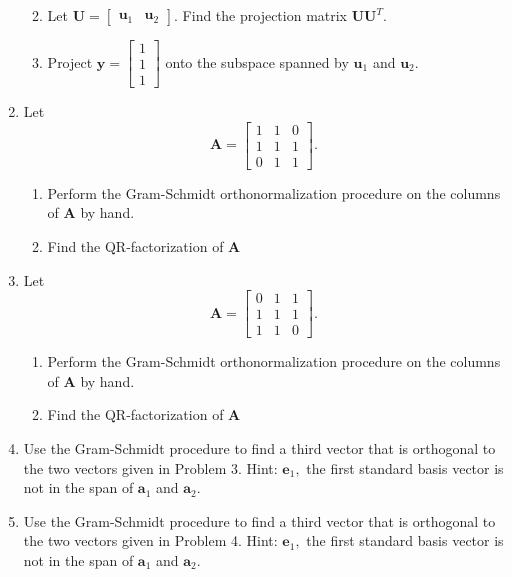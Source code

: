 \documentclass[
]{book}
\providecommand{\tightlist}{%
  \setlength{\itemsep}{0pt}\setlength{\parskip}{0pt}}
\theoremstyle{definition}
\theoremstyle{definition}
\theoremstyle{definition}
\theoremstyle{definition}
\theoremstyle{remark}
\begin{document}
\begin{enumerate}
  \begin{enumerate}
  \def\labelenumii{\alph{enumii}.}
  \tightlist
  \item
    Let \(\mathbf{U}=\begin{bmatrix} \mathbf{u}_1 & \mathbf{u}_2\end{bmatrix}.\) Find the projection matrix \(\mathbf{U}\mathbf{U}^T.\)
  \item
    Project \(\mathbf{y}=\begin{bmatrix}1\\1\\1\end{bmatrix}\) onto the subspace spanned by \(\mathbf{u}_1\) and \(\mathbf{u}_2.\)
  \end{enumerate}
\item
  Let
  \[\mathbf{A}=\begin{bmatrix}1 & 1 & 0\\1 & 1 & 1\\0 & 1 & 1\end{bmatrix}.\]

  \begin{enumerate}
  \def\labelenumii{\alph{enumii}.}
  \tightlist
  \item
    Perform the Gram-Schmidt orthonormalization procedure on the columns of \(\mathbf{A}\) by hand.
  \item
    Find the QR-factorization of \(\mathbf{A}\)
  \end{enumerate}
\item
  Let
  \[\mathbf{A}=\begin{bmatrix}0 & 1 & 1\\1 & 1 & 1\\1 & 1 & 0\end{bmatrix}.\]

  \begin{enumerate}
  \def\labelenumii{\alph{enumii}.}
  \tightlist
  \item
    Perform the Gram-Schmidt orthonormalization procedure on the columns of \(\mathbf{A}\) by hand.
  \item
    Find the QR-factorization of \(\mathbf{A}\)
  \end{enumerate}
\item
  Use the Gram-Schmidt procedure to find a third vector that is orthogonal to the two vectors given in Problem 3. Hint: \(\mathbf{e}_1,\) the first standard basis vector is not in the span of \(\mathbf{a}_1\) and \(\mathbf{a}_2\).
\item
  Use the Gram-Schmidt procedure to find a third vector that is orthogonal to the two vectors given in Problem 4. Hint: \(\mathbf{e}_1,\) the first standard basis vector is not in the span of \(\mathbf{a}_1\) and \(\mathbf{a}_2\).
\end{enumerate}
\end{document}
